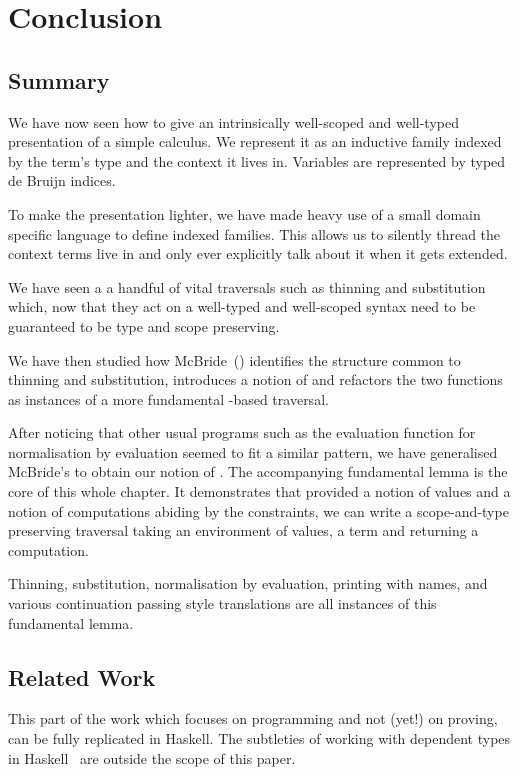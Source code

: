 \chapter{Conclusion}
\label{chapter:program-conclusion}

\section{Summary}

We have now seen how to give an intrinsically well-scoped and well-typed
presentation of a simple calculus. We represent it as an inductive family
indexed by the term's type and the context it lives in. Variables are
represented by typed de Bruijn indices.

To make the presentation lighter, we have made heavy use of a small domain
specific language to define indexed families. This allows us to silently
thread the context terms live in and only ever explicitly talk about it
when it gets extended.

We have seen a a handful of vital traversals such as thinning and substitution
which, now that they act on a well-typed and well-scoped syntax need to be
guaranteed to be type and scope preserving.

We have then studied how McBride~(\citeyear{mcbride2005type}) identifies the
structure common to thinning and substitution, introduces a notion of 
and refactors the two functions as instances of a more fundamental -based
traversal.

After noticing that other usual programs such as the evaluation function for
normalisation by evaluation seemed to fit a similar pattern, we have generalised
McBride's  to obtain our notion of . The accompanying
fundamental lemma is the core of this whole chapter. It demonstrates that
provided a notion of values and a notion of computations abiding by the
 constraints, we can write a scope-and-type preserving traversal
taking an environment of values, a term and returning a computation.

Thinning, substitution, normalisation by evaluation, printing with names, and
various continuation passing style translations are all instances of this
fundamental lemma.

\section{Related Work}

This part of the work which focuses on programming and not (yet!) on proving,
can be fully replicated in Haskell.
The subtleties of working with dependent types in Haskell~\cite{lindley2014hasochism}
are outside the scope of this paper.

